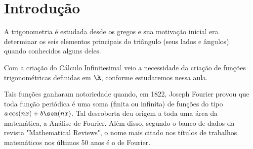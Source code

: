 \section{Introdução}

A trigonometria é estudada desde os gregos e sua motivação inicial
era determinar os seis elementos principais do triângulo (seus lados
e ângulos) quando conhecidos alguns deles.

Com a criação do Cálculo Infinitesimal veio a necessidade da criação
de funções trigonométricas definidas em $\R$, conforme estudaremos
nessa aula.

Tais funções ganharam notoriedade quando, em 1822, Joseph Fourier
provou que toda função periódica é uma soma (finita ou infinita) de
funções do tipo $a\cos (nx) +b \sen (nx)$. Tal descoberta deu origem
a toda uma área da matemática, a Análise de Fourier. Além disso,
segundo o banco de dados da revista "Mathematical Reviews", o nome
mais citado nos títulos de trabalhos matemáticos nos últimos 50 anos
é o de Fourier.

